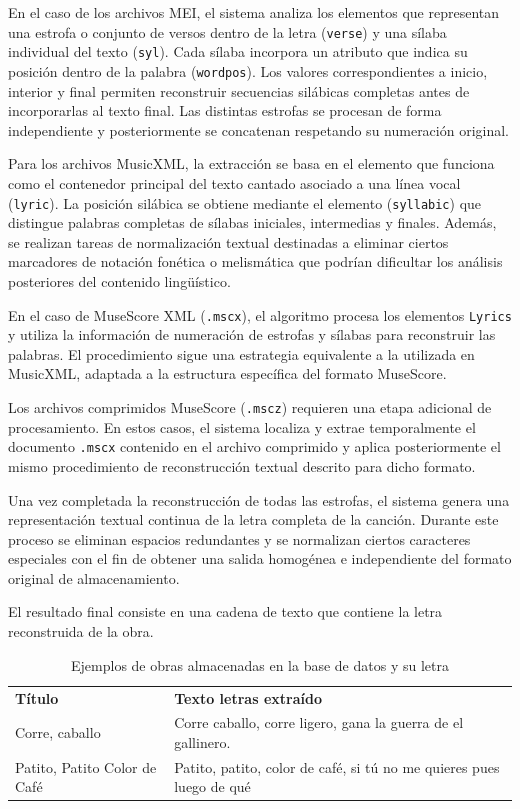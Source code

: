 En el caso de los archivos MEI, el sistema analiza los elementos que representan una estrofa o conjunto de versos dentro de la letra (\verb|verse|) y una sílaba individual del texto (\verb|syl|). Cada sílaba incorpora un atributo que indica su posición dentro de la palabra (\verb|wordpos|). Los valores correspondientes a inicio, interior y final permiten reconstruir secuencias silábicas completas antes de incorporarlas al texto final. Las distintas estrofas se procesan de forma independiente y posteriormente se concatenan respetando su numeración original.

Para los archivos MusicXML, la extracción se basa en el elemento que funciona como el contenedor principal del texto cantado asociado a una línea vocal (\verb|lyric|). La posición silábica se obtiene mediante el elemento (\verb|syllabic|) que distingue palabras completas de sílabas iniciales, intermedias y finales. Además, se realizan tareas de normalización textual destinadas a eliminar ciertos marcadores de notación fonética o melismática que podrían dificultar los análisis posteriores del contenido lingüístico.

En el caso de MuseScore XML (\verb|.mscx|), el algoritmo procesa los elementos \verb|Lyrics| y utiliza la información de numeración de estrofas y sílabas para reconstruir las palabras. El procedimiento sigue una estrategia equivalente a la utilizada en MusicXML, adaptada a la estructura específica del formato MuseScore.

Los archivos comprimidos MuseScore (\verb|.mscz|) requieren una etapa adicional de procesamiento. En estos casos, el sistema localiza y extrae temporalmente el documento \verb|.mscx| contenido en el archivo comprimido y aplica posteriormente el mismo procedimiento de reconstrucción textual descrito para dicho formato.

Una vez completada la reconstrucción de todas las estrofas, el sistema genera una representación textual continua de la letra completa de la canción. Durante este proceso se eliminan espacios redundantes y se normalizan ciertos caracteres especiales con el fin de obtener una salida homogénea e independiente del formato original de almacenamiento.

El resultado final consiste en una cadena de texto que contiene la letra reconstruida de la obra.

\begin{table}[H]
\centering
\begin{tabular}{l p{9.5cm}}
\textbf{Título} & \textbf{Texto letras extraído} \\
Corre, caballo & Corre caballo, corre ligero, gana la guerra de el gallinero. \\
Patito, Patito Color de Café & Patito, patito, color de café, si tú no me quieres pues luego de qué \\
\end{tabular}
\caption{Ejemplos de obras almacenadas en la base de datos y su letra}
\end{table}


